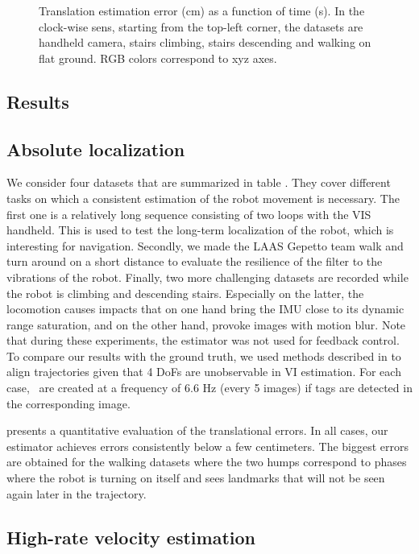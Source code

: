 \begin{figure}[t]
\begin{subfigure}{0.5\textwidth}
     \end{subfigure}%
    \caption{Translation estimation error (cm) as a function of time (s). In the clock-wise sens, starting from the 
             top-left corner, the datasets are handheld camera, stairs climbing, stairs descending and walking on flat ground. 
             RGB colors correspond to xyz axes.}
    \label{fig:results}
\end{figure}

\subsection{Results}

\subsection{Absolute localization}

We consider four datasets that are summarized in table . They cover different tasks on which a consistent 
estimation of the robot movement is necessary. The first one is a relatively long sequence consisting of two loops with the VIS handheld. 
This is used to test the long-term localization of the robot, which is interesting for navigation. Secondly, we made the LAAS Gepetto team 
 walk and turn around on a short distance to evaluate the resilience of the filter to the vibrations of the robot. Finally, two more 
challenging datasets are recorded while the robot is climbing and descending stairs. Especially on the latter, the locomotion causes impacts 
that on one hand bring the IMU close to its dynamic range saturation, and on the other hand, provoke images with motion blur. Note that during these experiments, 
the estimator was not used for feedback control. To compare our results with the ground truth, we used methods described in \cite{zhang2018tutorial} to align 
trajectories given that 4 DoFs are unobservable in VI estimation.
For each case, \keyframes\ are created at a frequency of 6.6 Hz (every 5 images) if tags are detected in the corresponding image.


 presents a quantitative evaluation of the translational errors. In all cases, our estimator achieves errors consistently below a few centimeters. 
The biggest errors are obtained for the walking datasets where the two humps correspond to phases where the robot is turning on itself and sees landmarks that will not be 
seen again later in the trajectory.

\subsection{High-rate velocity estimation}

